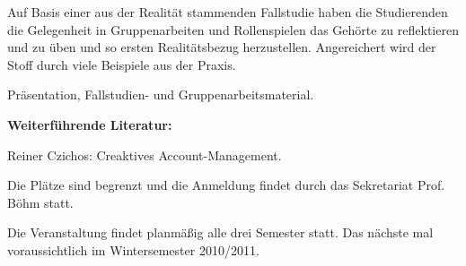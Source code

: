 \begin{course}
\begin{content}
Auf Basis einer aus der Realität stammenden Fallstudie haben die Studierenden die Gelegenheit in Gruppenarbeiten und Rollenspielen das Gehörte zu reflektieren und zu üben und so ersten Realitätsbezug herzustellen. Angereichert wird der Stoff durch viele Beispiele aus der Praxis.


\end{content}

\begin{media}Präsentation, Fallstudien- und Gruppenarbeitsmaterial.

\end{media}

\begin{literature}\textbf{Weiterführende Literatur:}

 

Reiner Czichos: Creaktives Account-Management.

\end{literature}

\begin{remarks}Die Plätze sind begrenzt und die Anmeldung findet durch das Sekretariat Prof. Böhm statt.

 

Die Veranstaltung findet planmäßig alle drei Semester statt. Das nächste mal voraussichtlich im Wintersemester 2010/2011.

\end{remarks}

\end{course}